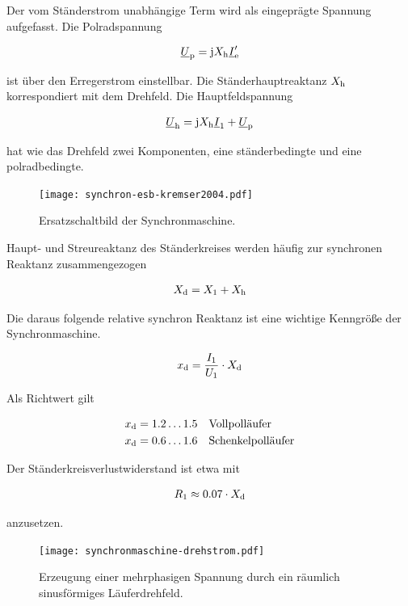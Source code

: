 Der vom Ständerstrom unabhängige Term wird als eingeprägte Spannung aufgefasst.
Die Polradspannung

\begin{align}
\underline{U}_{\mathrm{p}} = \mathrm{j}X_{\mathrm{h}}\underline{I}'_{\mathrm{e}}
\end{align}

ist über den Erregerstrom einstellbar.
Die Ständerhauptreaktanz $X_{\mathrm{h}}$ korrespondiert mit dem Drehfeld.
Die Hauptfeldspannung

\begin{align}
\underline{U}_{\mathrm{h}} = \mathrm{j} X_{\mathrm{h}} \underline{I}_{\mathrm{1}} + \underline{U}_{\mathrm{p}}
\end{align}

hat wie das Drehfeld zwei Komponenten, eine ständerbedingte und eine polradbedingte.

\begin{figure}[!htb]
\centering
\texttt{[image: synchron-esb-kremser2004.pdf]}
\label{fig:esb-kremser}
\caption{Ersatzschaltbild der Synchronmaschine.}
\end{figure}

Haupt- und Streureaktanz des Ständerkreises werden häufig zur synchronen Reaktanz zusammengezogen

\begin{align}
X_{\mathrm{d}} = X_{\mathrm{1}} + X_{\mathrm{h}}
\end{align}

Die daraus folgende relative synchron Reaktanz ist eine wichtige Kenngröße der Synchronmaschine.

\begin{align}
x_{\mathrm{d}} = \frac{I_{\mathrm{1}}}{U_{\mathrm{1}}}\cdot X_{\mathrm{d}}
\end{align}

Als Richtwert gilt

\begin{align*}
x_{\mathrm{d}} &= 1.2 \ldots 1.5\quad\text{Vollpolläufer} \\
x_{\mathrm{d}} &= 0.6 \ldots 1.6\quad\text{Schenkelpolläufer}
\end{align*}

Der Ständerkreisverlustwiderstand ist etwa mit 

\begin{align}
R_{\mathrm{1}} \approx 0.07\cdot X_{\mathrm{d}}
\end{align}

anzusetzen.

\begin{figure}[!htb]
\centering
\texttt{[image: synchronmaschine-drehstrom.pdf]}
\label{fig:drehstromwicklung}
\caption{Erzeugung einer mehrphasigen Spannung durch ein räumlich sinusförmiges Läuferdrehfeld.}
\end{figure}

